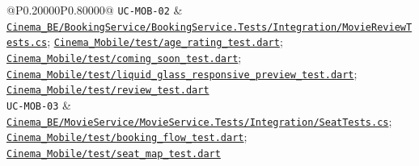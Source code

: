 \begin{longtable}{@{}P{0.20000\SRSWidth}P{0.80000\SRSWidth}@{}}
\texttt{UC-\allowbreak{}MOB-\allowbreak{}02} & \href{../../../Cinema\_BE/BookingService/BookingService.Tests/Integration/MovieReviewTests.cs}{\texttt{Cinema\_\allowbreak{}BE/\allowbreak{}Booking\allowbreak{}Service/\allowbreak{}Booking\allowbreak{}Service.\allowbreak{}Tests/\allowbreak{}Integrat\allowbreak{}ion/\allowbreak{}Movie\allowbreak{}Review\allowbreak{}Tests.\allowbreak{}cs}}; \href{../../../Cinema\_Mobile/test/age\_rating\_test.dart}{\texttt{Cinema\_\allowbreak{}Mobile/\allowbreak{}test/\allowbreak{}age\_\allowbreak{}rating\_\allowbreak{}test.\allowbreak{}dart}}; \href{../../../Cinema\_Mobile/test/coming\_soon\_test.dart}{\texttt{Cinema\_\allowbreak{}Mobile/\allowbreak{}test/\allowbreak{}coming\_\allowbreak{}soon\_\allowbreak{}test.\allowbreak{}dart}}; \href{../../../Cinema\_Mobile/test/liquid\_glass\_responsive\_preview\_test.dart}{\texttt{Cinema\_\allowbreak{}Mobile/\allowbreak{}test/\allowbreak{}liquid\_\allowbreak{}glass\_\allowbreak{}responsi\allowbreak{}ve\_\allowbreak{}preview\_\allowbreak{}test.\allowbreak{}dart}}; \href{../../../Cinema\_Mobile/test/review\_test.dart}{\texttt{Cinema\_\allowbreak{}Mobile/\allowbreak{}test/\allowbreak{}review\_\allowbreak{}test.\allowbreak{}dart}} \\[3pt]
\texttt{UC-\allowbreak{}MOB-\allowbreak{}03} & \href{../../../Cinema\_BE/MovieService/MovieService.Tests/Integration/SeatTests.cs}{\texttt{Cinema\_\allowbreak{}BE/\allowbreak{}Movie\allowbreak{}Service/\allowbreak{}Movie\allowbreak{}Service.\allowbreak{}Tests/\allowbreak{}Integrat\allowbreak{}ion/\allowbreak{}Seat\allowbreak{}Tests.\allowbreak{}cs}}; \href{../../../Cinema\_Mobile/test/booking\_flow\_test.dart}{\texttt{Cinema\_\allowbreak{}Mobile/\allowbreak{}test/\allowbreak{}booking\_\allowbreak{}flow\_\allowbreak{}test.\allowbreak{}dart}}; \href{../../../Cinema\_Mobile/test/seat\_map\_test.dart}{\texttt{Cinema\_\allowbreak{}Mobile/\allowbreak{}test/\allowbreak{}seat\_\allowbreak{}map\_\allowbreak{}test.\allowbreak{}dart}} \\[3pt]

\end{longtable}
